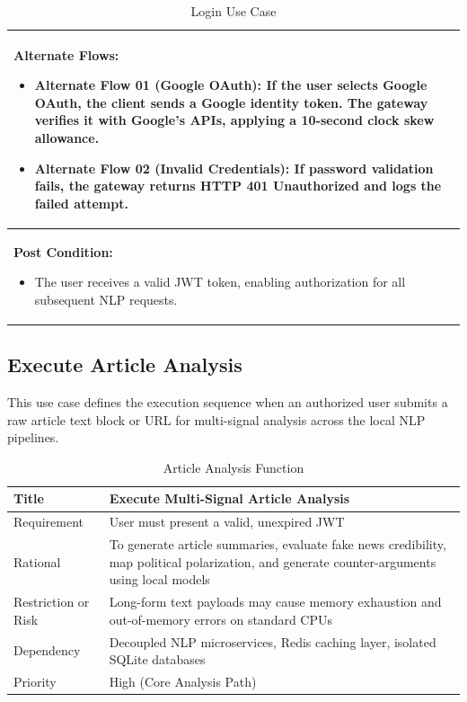 \begin{table}[H]
\begin{tabularx}{\textwidth}{| X |}
        \hline
        \textbf{Alternate Flows:}
        \begin{itemize}
            \item \textbf{Alternate Flow 01 (Google OAuth):} If the user selects Google OAuth, the client sends a Google identity token. The gateway verifies it with Google's APIs, applying a 10-second clock skew allowance.
            \item \textbf{Alternate Flow 02 (Invalid Credentials):} If password validation fails, the gateway returns HTTP 401 Unauthorized and logs the failed attempt.
        \end{itemize} \\
        \hline
        \textbf{Post Condition:}
        \begin{itemize}
            \item The user receives a valid JWT token, enabling authorization for all subsequent NLP requests.
        \end{itemize} \\
        \hline
    \end{tabularx}
    \caption{Login Use Case}
    \label{tab:login_use_case}
\end{table}

\clearpage
\subsection{Execute Article Analysis}
This use case defines the execution sequence when an authorized user submits a raw article text block or URL for multi-signal analysis across the local NLP pipelines.

\begin{table}[h!]
    \begin{tabularx}{\textwidth}{|l|X|}
        \hline
        Title & Execute Multi-Signal Article Analysis \\
        \hline
        Requirement & User must present a valid, unexpired JWT \\
        \hline
        Rational & To generate article summaries, evaluate fake news credibility, map political polarization, and generate counter-arguments using local models \\
        \hline
        Restriction or Risk & Long-form text payloads may cause memory exhaustion and out-of-memory errors on standard CPUs \\
        \hline
        Dependency & Decoupled NLP microservices, Redis caching layer, isolated SQLite databases \\
        \hline
        Priority & High (Core Analysis Path) \\
        \hline
    \end{tabularx}
    \caption{Article Analysis Function}
    \label{tab:table_article_analysis_function}
\end{table}

